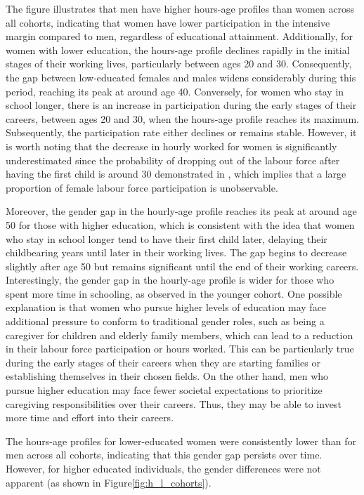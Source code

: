 \documentclass[12pt]{article}
\begin{document}
\par
The figure illustrates that men have higher hours-age profiles than women across all cohorts, indicating that women have
lower participation in the intensive margin compared to men, regardless of educational attainment. Additionally, for
women with lower education, the hours-age profile declines rapidly in the initial stages of their working lives,
particularly between ages 20 and 30. Consequently, the gap between low-educated females and males widens considerably
during this period, reaching its peak at around age 40. Conversely, for women who stay in school longer, there is an
increase in participation during the early stages of their careers, between ages 20 and 30, when the hours-age profile
reaches its maximum. Subsequently, the participation rate either declines or remains stable. However, it is worth noting
that the decrease in hourly worked for women is significantly underestimated since the probability of dropping out of
the labour force after having the first child is around 30%
demonstrated in \citet{Bratti2005}, which implies that a large proportion of female labour force participation is
unobservable.

\par
Moreover, the gender gap in the hourly-age profile reaches its peak at around age 50 for those with higher education,
which is consistent with the idea that women who stay in school longer tend to have their first child later, delaying
their childbearing years until later in their working lives. The gap begins to decrease slightly after age 50 but
remains significant until the end of their working careers. Interestingly, the gender gap in the hourly-age profile is
wider for those who spent more time in schooling, as observed in the younger cohort. One possible explanation is that
women who pursue higher levels of education may face additional pressure to conform to traditional gender roles, such as
being a caregiver for children and elderly family members, which can lead to a reduction in their labour force
participation or hours worked. This can be particularly true during the early stages of their careers when they are
starting families or establishing themselves in their chosen fields. On the other hand, men who pursue higher education
may face fewer societal expectations to prioritize caregiving responsibilities over their careers. Thus, they may be
able to invest more time and effort into their careers.


The hours-age profiles for lower-educated women were consistently lower than for men across all cohorts, indicating that
this gender gap persists over time. However, for higher educated individuals, the gender differences were not apparent
(as shown in Figure\ref{fig:h_l_cohorts}).
\end{document}
